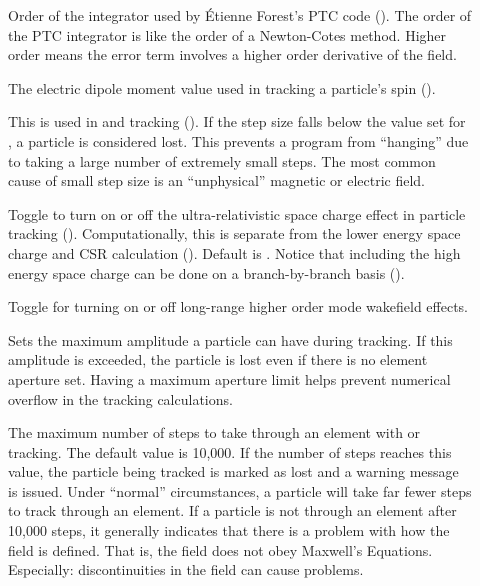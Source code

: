 {\begin{description}
%
\item[] \Newline
Order of the integrator used by \'Etienne Forest's PTC code ().
The order of the PTC integrator is like the order of a Newton-Cotes method.
Higher order means the error term involves a higher order derivative of the field.
%
\item[] \Newline
The electric dipole moment value used in tracking a particle's spin ().
%
\item[] \Newline
This is used in  and  tracking
().  If the step size falls below the value set for
, a particle is considered lost.
This prevents a program from ``hanging'' due to taking a large number
of extremely small steps. The most common cause of small step size is
an ``unphysical'' magnetic or electric field.
%
\item[] \Newline
Toggle to turn on or off the ultra-relativistic space charge effect in particle tracking
(). Computationally, this is separate from the lower energy space charge and
CSR calculation (). Default is . Notice that including the high energy space
charge can be done on a branch-by-branch basis ().
%
\item[] \Newline
Toggle for turning on or off long-range higher order mode wakefield effects.
%
\item[] \Newline 
Sets the maximum amplitude a particle can have during tracking. If this amplitude is exceeded, the
particle is lost even if there is no element aperture set. Having a maximum aperture limit helps
prevent numerical overflow in the tracking calculations.
%
\item[] \Newline 
The maximum number of steps to take through an element with  or
 tracking. The default value is 10,000. If the number of steps reaches this
value, the particle being tracked is marked as lost and a warning message is issued. Under
``normal'' circumstances, a particle will take far fewer steps to track through an element. If a
particle is not through an element after 10,000 steps, it generally indicates that there is a
problem with how the field is defined. That is, the field does not obey Maxwell's
Equations. Especially: discontinuities in the field can cause problems.

\end{description}}
